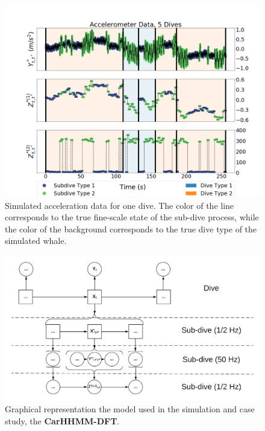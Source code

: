 
\begin{figure}[ht]
	\centering
	\includegraphics[width=5.5in]{../Plots/sim_data.png}
	\caption{Simulated acceleration data for one dive. The color of the line corresponds to the true fine-scale state of the sub-dive process, while the color of the background corresponds to the true dive type of the simulated whale.}
	\label{fig:sim_data}
\end{figure}

\begin{figure}[ht]
	\centering
	\includegraphics[width=5in]{../Plots/CarHHMM-DFT.png}
	\caption{Graphical representation the model used in the simulation and case study, the \textbf{CarHHMM-DFT}.}
	\label{fig:CarHHMM-DFT}
\end{figure}

